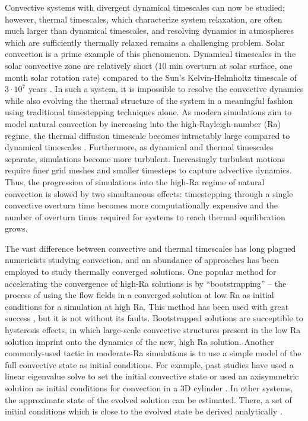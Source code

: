 \documentclass[aps, pre, onecolumn, nofootinbib, notitlepage, groupedaddress, amsfonts, amssymb, amsmath, longbibliography]{revtex4-1}
\begin{document}
Convective systems with divergent dynamical timescales can now be studied; however,
thermal timescales, which characterize system relaxation, are often much larger than
dynamical timescales, and resolving dynamics in atmospheres which are sufficiently
thermally relaxed remains a challenging problem.
Solar convection is a prime example of this phenomenon.
Dynamical timescales in the solar convective zone are relatively short 
(10 min overturn at solar surface, one month solar
rotation rate) compared to the Sun's Kelvin-Helmholtz timescale of
$3 \cdot 10^7$ years \cite{stix2003}.  
In such a system, it is impossible to resolve the convective dynamics while also
evolving the thermal structure of the system in a meaningful fashion using
traditional timestepping techniques alone.
As modern simulations aim to model natural convection
by increasing into the high-Rayleigh-number (Ra) regime,
the thermal diffusion timescale becomes intractably large
compared to dynamical timescales \cite{anders&brown2017}.
Furthermore, as dynamical and thermal timescales separate, 
simulations become more turbulent. Increasingly turbulent motions 
require finer grid meshes and smaller timesteps
to capture advective dynamics. Thus, the progression of simulations into the high-Ra
regime of natural convection is slowed by two simultaneous effects: timestepping
through a single convective overturn time becomes more computationally expensive
and the number of overturn times required for systems to reach thermal equilibration
grows.

The vast difference between convective and thermal timescales has long plagued
numericists studying convection, and an abundance of approaches has been employed to
study thermally converged solutions. One popular method for accelerating the convergence
of high-Ra solutions is by ``bootstrapping'' -- the process of using the flow
fields in a converged solution at low Ra as initial conditions for a simulation at high
Ra.  This method has been used with great success \cite{johnston&doering2009, verzicco&camussi1997},
but it is not without its faults.  Bootstrapped solutions are succeptible to hysteresis
effects, in which large-scale convective structures present in the
low Ra solution imprint onto the dynamics of the new, high Ra solution. 
Another commonly-used tactic in
moderate-Ra simulations is to use 
a simple model of the full convective state as initial conditions.  
For example, past studies have used a linear eigenvalue solve to set the initial
convective state \cite{hurlburt&all1984} or used an axisymmetric solution 
as initial conditions for convection in a 3D cylinder \cite{verzicco&camussi1997}. 
In other systems, 
the approximate state of the evolved solution can be estimated. There, a
set of initial conditions which is close to the evolved state be 
derived analytically \cite{couston&all2017, brandenburg&all2005}.
\end{document}
